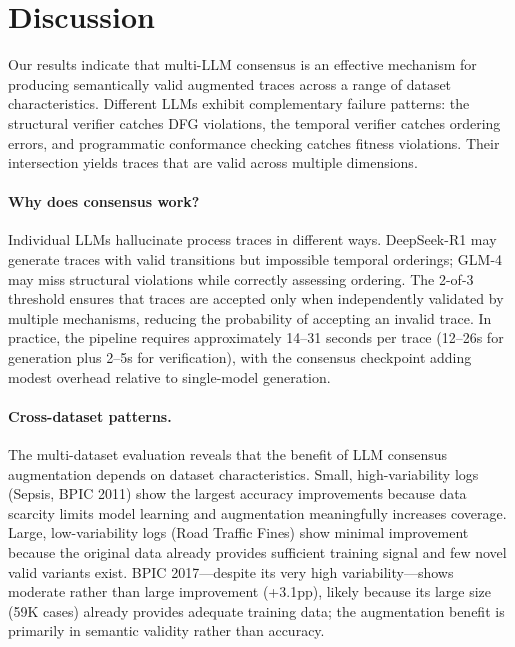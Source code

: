 \documentclass[11pt,a4paper]{article}
\begin{document}
\section{Discussion}

Our results indicate that multi-LLM consensus is an effective mechanism for producing semantically valid augmented traces across a range of dataset characteristics. Different LLMs exhibit complementary failure patterns: the structural verifier catches DFG violations, the temporal verifier catches ordering errors, and programmatic conformance checking catches fitness violations. Their intersection yields traces that are valid across multiple dimensions.

\paragraph{Why does consensus work?} Individual LLMs hallucinate process traces in different ways. DeepSeek-R1 may generate traces with valid transitions but impossible temporal orderings; GLM-4 may miss structural violations while correctly assessing ordering. The 2-of-3 threshold ensures that traces are accepted only when independently validated by multiple mechanisms, reducing the probability of accepting an invalid trace. In practice, the pipeline requires approximately 14--31 seconds per trace (12--26s for generation plus 2--5s for verification), with the consensus checkpoint adding modest overhead relative to single-model generation.

\paragraph{Cross-dataset patterns.} The multi-dataset evaluation reveals that the benefit of LLM consensus augmentation depends on dataset characteristics. Small, high-variability logs (Sepsis, BPIC 2011) show the largest accuracy improvements because data scarcity limits model learning and augmentation meaningfully increases coverage. Large, low-variability logs (Road Traffic Fines) show minimal improvement because the original data already provides sufficient training signal and few novel valid variants exist. BPIC 2017---despite its very high variability---shows moderate rather than large improvement (+3.1pp), likely because its large size (59K cases) already provides adequate training data; the augmentation benefit is primarily in semantic validity rather than accuracy.
\end{document}
